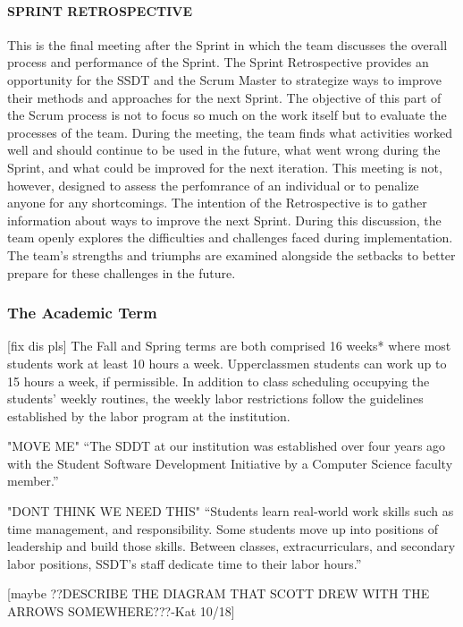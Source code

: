 \paragraph{SPRINT RETROSPECTIVE}
This is the final meeting after the Sprint in which the team discusses the overall process and performance of the Sprint. The Sprint Retrospective provides an opportunity for the SSDT and the Scrum Master to strategize ways to improve their methods and approaches for the next Sprint. The objective of this part of the Scrum process is not to focus so much on the work itself but to evaluate the processes of the team. During the meeting, the team finds what activities worked well and should continue to be used in the future, what went wrong during the Sprint, and what could be improved for the next iteration. This meeting is not, however, designed to assess the perfomrance of an individual or to penalize anyone for any shortcomings. The intention of the Retrospective is to gather information about ways to improve the next Sprint. During this discussion, the team openly explores the difficulties and challenges faced during implementation. The team's strengths and triumphs are examined alongside the setbacks to better prepare for these challenges in the future.

\subsubsection{The Academic Term} [fix dis pls]
The Fall and Spring terms are both comprised 16 weeks* where most students work at least 10 hours a week. Upperclassmen students can work up to 15 hours a week, if permissible. In addition to class scheduling occupying the students' weekly routines, the weekly labor restrictions follow the guidelines established by the labor program at the institution.


"MOVE ME" ``The SDDT at our institution was established over four years ago with the Student Software Development Initiative by a Computer Science faculty member.''

"DONT THINK WE NEED THIS" ``Students learn real-world work skills such as time management, and responsibility. Some students move up into positions of leadership and build those skills. Between classes, extracurriculars, and secondary labor positions, SSDT's staff dedicate time to their labor hours.''





[maybe ??DESCRIBE THE DIAGRAM THAT SCOTT DREW WITH THE ARROWS SOMEWHERE???-Kat 10/18]
